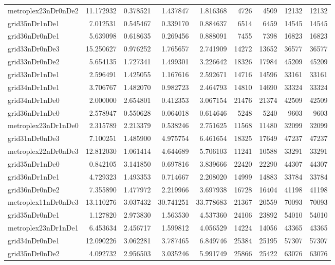 \begin{longtable}{|l|r|r|r|r|r|r|r|r|}
metroplex23nDr0nDe2 & 11.172932 & 0.378521 & 1.437847 & 1.816368 & 4726 & 4509 & 12132 & 12132 \\
grid35nDr1nDe1 & 7.012531 & 0.545467 & 0.339170 & 0.884637 & 6514 & 6459 & 14545 & 14545 \\
grid36nDr0nDe1 & 5.639098 & 0.618635 & 0.269456 & 0.888091 & 7455 & 7398 & 16823 & 16823 \\
grid33nDr0nDe3 & 15.250627 & 0.976252 & 1.765657 & 2.741909 & 14272 & 13652 & 36577 & 36577 \\
grid33nDr0nDe2 & 5.654135 & 1.727341 & 1.499301 & 3.226642 & 18326 & 17984 & 45209 & 45209 \\
grid33nDr1nDe1 & 2.596491 & 1.425055 & 1.167616 & 2.592671 & 14716 & 14596 & 33161 & 33161 \\
grid34nDr1nDe1 & 3.706767 & 1.482070 & 0.982723 & 2.464793 & 14810 & 14690 & 33324 & 33324 \\
grid34nDr1nDe0 & 2.000000 & 2.654801 & 0.412353 & 3.067154 & 21476 & 21374 & 42509 & 42509 \\
grid36nDr1nDe0 & 2.578947 & 0.550628 & 0.064018 & 0.614646 & 5248 & 5240 & 9603 & 9603 \\
metroplex23nDr1nDe0 & 2.315789 & 2.213379 & 0.538246 & 2.751625 & 11568 & 11480 & 32099 & 32099 \\
grid31nDr0nDe3 & 7.100251 & 1.485900 & 4.975754 & 6.461654 & 18325 & 17649 & 47237 & 47237 \\
metroplex22nDr0nDe3 & 12.812030 & 1.061414 & 4.644689 & 5.706103 & 11241 & 10588 & 33291 & 33291 \\
grid35nDr1nDe0 & 0.842105 & 3.141850 & 0.697816 & 3.839666 & 22420 & 22290 & 44307 & 44307 \\
grid36nDr1nDe1 & 4.729323 & 1.493353 & 0.714667 & 2.208020 & 14999 & 14883 & 33784 & 33784 \\
grid36nDr0nDe2 & 7.355890 & 1.477972 & 2.219966 & 3.697938 & 16728 & 16404 & 41198 & 41198 \\
metroplex11nDr0nDe3 & 13.110276 & 3.037432 & 30.741251 & 33.778683 & 21367 & 20559 & 70093 & 70093 \\
grid35nDr0nDe1 & 1.127820 & 2.973830 & 1.563530 & 4.537360 & 24106 & 23892 & 54010 & 54010 \\
metroplex23nDr1nDe1 & 6.453634 & 2.456717 & 1.599812 & 4.056529 & 14224 & 14056 & 43365 & 43365 \\
grid34nDr0nDe1 & 12.090226 & 3.062281 & 3.787465 & 6.849746 & 25384 & 25195 & 57307 & 57307 \\
grid35nDr0nDe2 & 4.092732 & 2.956503 & 3.035246 & 5.991749 & 25866 & 25422 & 63076 & 63076 \\

\end{longtable}
